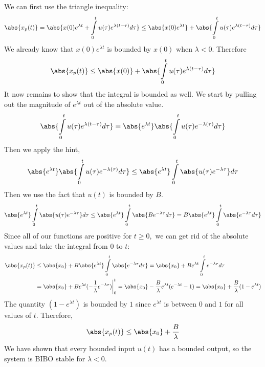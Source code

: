 \begin{enumerate}
{    We can first use the triangle inequality:
    $$\abs{x_{p}(t)} = \abs{x(0) e^{\lambda t} + \int\limits_{0}^{t} u(\tau) e^{\lambda(t - \tau)} d \tau} \leq 
    \abs{x(0) e^{\lambda t}} + \abs{\int\limits_{0}^{t} u(\tau) e^{\lambda(t - \tau)} d \tau}$$
    We already know that $x(0) e^{\lambda t}$ is bounded by $x(0)$ when $\lambda < 0.$ Therefore
    $$\abs{x_{p}(t)} \leq \abs{x(0)} + \abs{\int\limits_{0}^{t} u(\tau) e^{\lambda(t - \tau)} d \tau}$$
    It now remains to show that the integral is bounded as well. 
    We start by pulling out the magnitude of $e^{\lambda t}$ out of the absolute value.
    $$\abs{\int\limits_{0}^{t} u(\tau) e^{\lambda(t - \tau)} d \tau} = 
    \abs{e^{\lambda t}} \abs{\int\limits_{0}^{t} u(\tau) e^{-\lambda(\tau)} d \tau}$$
    Then we apply the hint, 
    $$\abs{e^{\lambda t}} \abs{\int\limits_{0}^{t} u(\tau) e^{-\lambda(\tau)} d \tau}
    \leq \abs{e^{\lambda t}} \int\limits_{0}^{t} \abs{u(\tau) e^{-\lambda \tau}} d \tau$$
    Then we use the fact that $u(t)$ is bounded by $B.$
    $$\abs{e^{\lambda t}} \int\limits_{0}^{t} \abs{u(\tau) e^{-\lambda \tau}} d \tau
    \leq \abs{e^{\lambda t}}  \int\limits_{0}^{t} \abs{B e^{-\lambda \tau} d \tau} = 
    B \abs{e^{\lambda t}} \int\limits_{0}^{t} \abs{e^{-\lambda \tau} d \tau}$$
    Since all of our functions are positive for $t \geq 0,$ we can get rid of the absolute values and take the integral from $0$ to $t$:
    \begin{align*}
    \abs{x_{p}(t)} &\leq \abs{x_{0}} + B \abs{e^{\lambda t}} \int\limits_{0}^{t} \abs{e^{-\lambda \tau} d \tau} = \abs{x_{0}} + B e^{\lambda t} \int\limits_{0}^{t} e^{-\lambda \tau} d \tau \\
    &= \abs{x_{0}} + Be^{\lambda t} (-\frac{1}{\lambda} e^{-\lambda \tau})\biggr\rvert_{0}^{t} 
    = \abs{x_{0}} - \frac{B}{\lambda}e^{\lambda t} (e^{-\lambda t} - 1) = \abs{x_{0}} + 
    \frac{B}{\lambda} (1 - e^{\lambda t}) 
    \end{align*}
    The quantity $(1 - e^{\lambda t})$ is bounded by $1$ since $e^{\lambda t}$ is between $0$ and $1$ for all values of $t.$ Therefore,
    $$\abs{x_{p}(t)} \leq \abs{x_{0}} + \frac{B}{\lambda}$$
    We have shown that every bounded input $u(t)$ has a bounded output, so the system is BIBO stable for $\lambda < 0.$
  }

\end{enumerate}